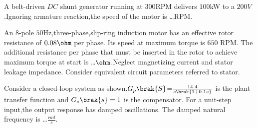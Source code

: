     \item A belt-driven $DC$ shunt generator running at $300$RPM delivers $100$kW to a $200 V$.Ignoring armature reaction,the speed of the motor is \dots RPM.
   \item An $8$-pole $50$Hz,three-phase,slip-ring induction motor has an effective rotor resistance of $0.08\ohm$ per phase. Its speed at maximum torque is $650$ RPM. The additional resistance per phase that must be inserted in the rotor to achieve maximum torque at start is \dots $\ohm$.Neglect magnetizing current and stator leakage impedance. Consider equivalent circuit parameters referred to stator.
    \item Consider a closed-loop system as shown.$G_{p}\brak{S}$=$\frac{14.4}{s\brak{1+0.1s}}$ is the plant transfer function and $G_{e}\brak{s}=1$ is the compensator. For a unit-step input,the output response has damped oscillations. The damped natural frequency is \dots $\frac{rad}{s}$.\\

